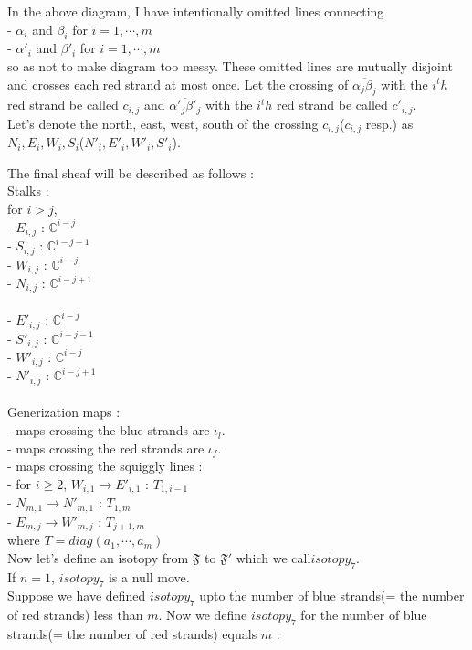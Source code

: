 In the above diagram, I have intentionally omitted lines connecting \\
- $\alpha_i$ and $\beta_i$ for $i=1,\cdots,m$\\
- $\alpha'_i$ and $\beta'_i$ for $i=1,\cdots,m$\\
so as not to make diagram too messy. These omitted lines are mutually disjoint and crosses each red strand at most once. Let the crossing of $\overline{\alpha_j \beta_j}$ with the $i^th$ red strand be called $c_{i,j}$ and $\overline{\alpha'_j \beta'_j}$ with the $i^th$ red strand be called $c'_{i,j}$.\\
Let's denote the north, east, west, south of the crossing $c_{i,j}$($c_{i,j}$ resp.) as $N_i,E_i,W_i,S_i$($N'_i,E'_i,W'_i,S'_i$).\\

\bigskip

The final sheaf will be described as follows :\\

Stalks :\\
for $i>j$,\\
- $E_{i,j}$ : $\mathbb{C}^{i-j}$\\
- $S_{i,j}$ : $\mathbb{C}^{i-j-1}$\\
- $W_{i,j}$ : $\mathbb{C}^{i-j}$\\
- $N_{i,j}$ : $\mathbb{C}^{i-j+1}$\\
\\
- $E'_{i,j}$ : $\mathbb{C}^{i-j}$\\
- $S'_{i,j}$ : $\mathbb{C}^{i-j-1}$\\
- $W'_{i,j}$ : $\mathbb{C}^{i-j}$\\
- $N'_{i,j}$ : $\mathbb{C}^{i-j+1}$\\
\\
Generization maps : \\
- maps crossing the blue strands are $\iota_l$.\\
- maps crossing the red strands are $\iota_f$.\\
- maps crossing the squiggly lines :\\
	- for $i\geq 2$, $W_{i,1}\rightarrow E'_{i,1}$ : $T_{1,i-1}$\\
	- $N_{m,1}\rightarrow N'_{m,1}$ : $T_{1,m}$\\
	- $E_{m,j}\rightarrow W'_{m,j}$ : $T_{j+1,m}$\\
	where $T = diag(a_1,\cdots,a_m)$\\
	
Now let's define an isotopy from $\mathfrak{F}$ to $\mathfrak{F}'$ which we call$isotopy_7$.\\
If $n=1$, $isotopy_7$ is a null move.\\
Suppose we have defined $isotopy_7$ upto the number of blue strands(= the number of red strands) less than $m$. Now we define $isotopy_7$ for the number of blue strands(= the number of red strands) equals $m$ :\\

